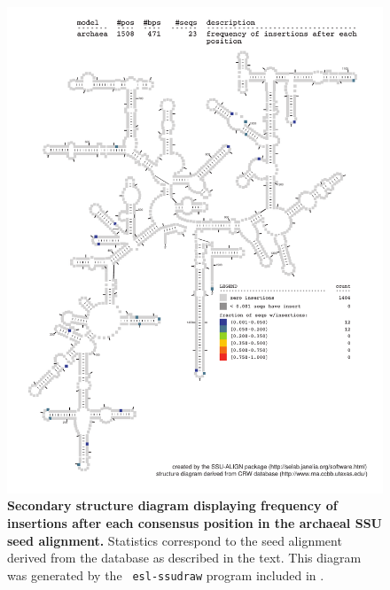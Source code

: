 \begin{figure}
\begin{center}
\includegraphics[width=5.7in]{Figures/archaea-0p1-ifreq}
\end{center}
\caption[Secondary structure diagram displaying frequency of insertions
  after each consensus position in the archaeal SSU seed
  alignment]{\textbf{Secondary structure diagram displaying frequency
  of insertions after each consensus position in the archaeal SSU seed
  alignment.} Statistics correspond to the  seed
  alignment derived from the  database \cite{CannoneGutell02}
  as described in the text. This diagram was generated by the {\tt
  esl-ssudraw} program included in .}
\label{fig:arcifreq}
\end{figure}

